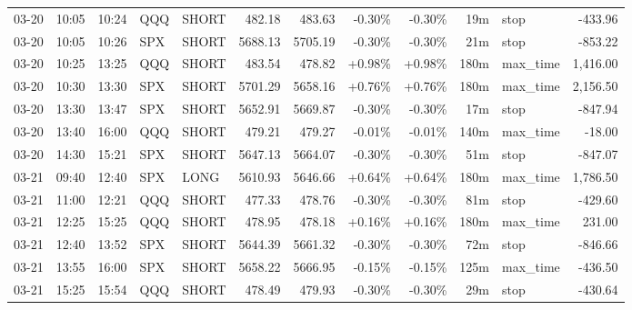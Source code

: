 \documentclass[11pt,a4paper,twoside]{article}
\begin{document}
\begin{center}
\begin{longtable}{>{\color{txtmain}}l l l l l r r r r r >{\color{txtmain}}l r}
03-20 & 10:05 & 10:24 & QQQ & SHORT & 482.18 & 483.63 & \textcolor{lossred}{-0.30\%} & \textcolor{lossred}{-0.30\%} & 19m & stop & \textcolor{lossred}{-433.96} \\
03-20 & 10:05 & 10:26 & SPX & SHORT & 5688.13 & 5705.19 & \textcolor{lossred}{-0.30\%} & \textcolor{lossred}{-0.30\%} & 21m & stop & \textcolor{lossred}{-853.22} \\
03-20 & 10:25 & 13:25 & QQQ & SHORT & 483.54 & 478.82 & \textcolor{wingreen}{+0.98\%} & \textcolor{wingreen}{+0.98\%} & 180m & max\_time & \textcolor{wingreen}{1,416.00} \\
03-20 & 10:30 & 13:30 & SPX & SHORT & 5701.29 & 5658.16 & \textcolor{wingreen}{+0.76\%} & \textcolor{wingreen}{+0.76\%} & 180m & max\_time & \textcolor{wingreen}{2,156.50} \\
03-20 & 13:30 & 13:47 & SPX & SHORT & 5652.91 & 5669.87 & \textcolor{lossred}{-0.30\%} & \textcolor{lossred}{-0.30\%} & 17m & stop & \textcolor{lossred}{-847.94} \\
03-20 & 13:40 & 16:00 & QQQ & SHORT & 479.21 & 479.27 & \textcolor{lossred}{-0.01\%} & \textcolor{lossred}{-0.01\%} & 140m & max\_time & \textcolor{lossred}{-18.00} \\
03-20 & 14:30 & 15:21 & SPX & SHORT & 5647.13 & 5664.07 & \textcolor{lossred}{-0.30\%} & \textcolor{lossred}{-0.30\%} & 51m & stop & \textcolor{lossred}{-847.07} \\
03-21 & 09:40 & 12:40 & SPX & LONG & 5610.93 & 5646.66 & \textcolor{wingreen}{+0.64\%} & \textcolor{wingreen}{+0.64\%} & 180m & max\_time & \textcolor{wingreen}{1,786.50} \\
03-21 & 11:00 & 12:21 & QQQ & SHORT & 477.33 & 478.76 & \textcolor{lossred}{-0.30\%} & \textcolor{lossred}{-0.30\%} & 81m & stop & \textcolor{lossred}{-429.60} \\
03-21 & 12:25 & 15:25 & QQQ & SHORT & 478.95 & 478.18 & \textcolor{wingreen}{+0.16\%} & \textcolor{wingreen}{+0.16\%} & 180m & max\_time & \textcolor{wingreen}{231.00} \\
03-21 & 12:40 & 13:52 & SPX & SHORT & 5644.39 & 5661.32 & \textcolor{lossred}{-0.30\%} & \textcolor{lossred}{-0.30\%} & 72m & stop & \textcolor{lossred}{-846.66} \\
03-21 & 13:55 & 16:00 & SPX & SHORT & 5658.22 & 5666.95 & \textcolor{lossred}{-0.15\%} & \textcolor{lossred}{-0.15\%} & 125m & max\_time & \textcolor{lossred}{-436.50} \\
03-21 & 15:25 & 15:54 & QQQ & SHORT & 478.49 & 479.93 & \textcolor{lossred}{-0.30\%} & \textcolor{lossred}{-0.30\%} & 29m & stop & \textcolor{lossred}{-430.64} \\

\end{longtable}
\end{center}
\end{document}

